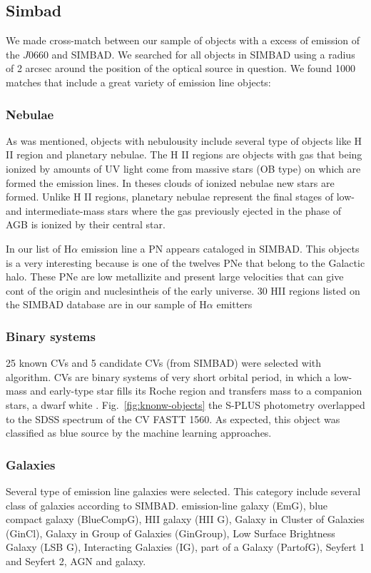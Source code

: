 \documentclass[fleqn,usenatbib]{mnras}
\begin{document}
\subsection{Simbad}

We made cross-match between our sample of objects with a excess of emission of
the $J$0660 and SIMBAD. We searched for all objects in SIMBAD using a radius of 2 arcsec
around the position of the optical source in question. We found 1000
matches that include a great variety of emission line objects:

\subsubsection{Nebulae}

As was mentioned, objects with nebulousity include several
type of objects like H II region and  planetary nebulae.
The H II regions are objects with gas that being ionized by
amounts of UV light come from massive stars (OB type) on which
are formed the emission lines. In theses clouds of ionized nebulae
new stars are formed. Unlike H II regions, planetary nebulae
represent the final stages of low- and intermediate-mass stars
where the gas previously ejected in the phase of AGB is ionized
by their central star.

In our list of H{$\alpha$} emission line a PN appears cataloged in SIMBAD.
This objects is a very interesting because is one of the twelves PNe that belong
to the Galactic halo. These PNe are low metallizite and present large velocities that
can give cont of the origin and nuclesintheis of the early universe. 30 HII regions
listed on the SIMBAD database are in our sample of H{$\alpha$} emitters

\subsubsection{Binary systems}
25 known CVs and 5 candidate CVs (from SIMBAD) were selected with algorithm.
CVs are binary systems of very short orbital period, in which a low-mass and
early-type star fills its Roche region and transfers mass to a companion stars,
a dwarf white \citep{Patterson:1984}. Fig.~\ref{fig:knonw-objects} the S-PLUS
photometry overlapped to the SDSS spectrum of the CV FASTT 1560. As expected,
this object was classified as blue source by the machine learning approaches.

\subsubsection{Galaxies}
Several type of emission line galaxies were selected. This category include
several class of galaxies according to SIMBAD. emission-line galaxy (EmG),
blue compact galaxy (BlueCompG), HII galaxy (HII G), Galaxy in Cluster of Galaxies
(GinCl), Galaxy in Group of Galaxies (GinGroup), Low Surface Brightness Galaxy
(LSB G), Interacting Galaxies (IG), part of a Galaxy (PartofG), Seyfert 1 and
Seyfert 2, AGN and galaxy.
\end{document}
